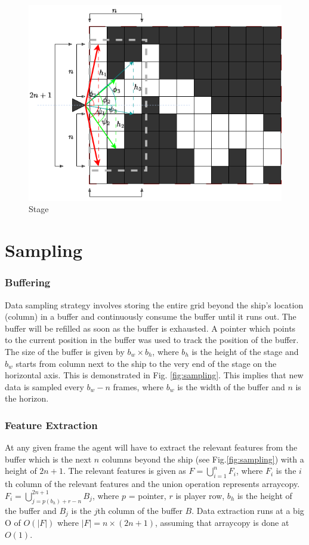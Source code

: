 \documentclass[10pt,journal,compsoc]{IEEEtran}
\begin{document}
\begin{figure}
    \centering
    \includegraphics[width=\linewidth]{stage.png}
    \caption{Stage}
    \label{fig:stage}
\end{figure}

\section{Sampling}
\subsubsection*{Buffering}
Data sampling strategy involves storing the entire grid beyond the ship's location (column) in a buffer and 
continuously consume the buffer until it runs out. The buffer will be refilled as soon as the buffer is 
exhausted. A pointer which points to the current position in the buffer was used to track the position of 
the buffer. The size of the buffer is given by $b_w \times b_h$, where $b_h$ is the height of the stage and 
$b_w$ starts from column next to the ship to the very end of the stage on the horizontal axis. 
This is demonstrated in Fig. \ref{fig:sampling}. This implies that new data is sampled every
$b_w - n$ frames, where $b_w$ is the width of the buffer and $n$ is the horizon. 
\subsubsection*{Feature Extraction} 
At any given frame the agent will have to extract the relevant features from the buffer which is the next $n$
columns beyond the ship (see Fig.\ref{fig:sampling}) with a height of $2n + 1$. The relevant features is given
as $F = \bigcup\limits_{i=1}^{n}F_i$, where $F_i$ is the $i$th column of the relevant features and the union 
operation represents arraycopy. $F_i = \bigcup\limits_{j = p(b_h) + r - n}^{2n + 1} B_j$, where $p$ = pointer,
 $r$ is player row, $b_h$ is the height of the buffer and $B_j$ is the $j$th column of the 
buffer $B$. Data extraction runs at a big O of $O(|F|)$ where $|F|=n \times (2n+1)$, assuming that arraycopy
is done at $O(1)$.
\end{document}
